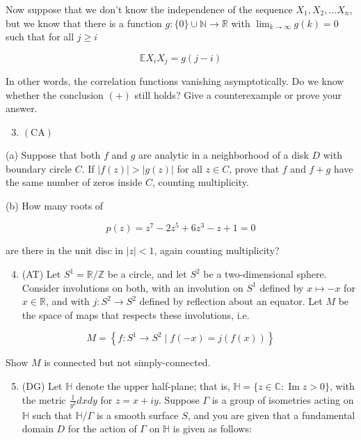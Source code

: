 \documentclass[10pt]{article}
\begin{document}
Now suppose that we don't know the independence of the sequence $X_{1}, X_{2}, \ldots X_{n}$, but we know that there is a function $g:\{0\} \cup \mathbb{N} \rightarrow \mathbb{R}$ with $\lim _{k \rightarrow \infty} g(k)=0$ such that for all $j \geq i$

$$
\mathbb{E} X_{i} X_{j}=g(j-i)
$$

In other words, the correlation functions vanishing asymptotically. Do we know whether the conclusion $(+)$ still holds? Give a counterexample or prove your answer.

\begin{enumerate}
  \setcounter{enumi}{2}
  \item $(\mathrm{CA})$
\end{enumerate}

(a) Suppose that both $f$ and $g$ are analytic in a neighborhood of a disk $D$ with boundary circle $C$. If $|f(z)|>|g(z)|$ for all $z \in C$, prove that $f$ and $f+g$ have the same number of zeros inside $C$, counting multiplicity.

(b) How many roots of

$$
p(z)=z^{7}-2 z^{5}+6 z^{3}-z+1=0
$$

are there in the unit disc in $|z|<1$, again counting multiplicity?

\begin{enumerate}
  \setcounter{enumi}{3}
  \item (AT) Let $S^{1}=\mathbb{R} / \mathbb{Z}$ be a circle, and let $S^{2}$ be a two-dimensional sphere. Consider involutions on both, with an involution on $S^{1}$ defined by $x \mapsto-x$
for $x \in \mathbb{R}$, and with $j: S^{2} \rightarrow S^{2}$ defined by reflection about an equator. Let $M$ be the space of maps that respects these involutions, i.e.
\end{enumerate}

$$
M=\left\{f: S^{1} \rightarrow S^{2} \mid f(-x)=j(f(x))\right\}
$$

Show $M$ is connected but not simply-connected.

\begin{enumerate}
  \setcounter{enumi}{4}
  \item (DG) Let $\mathbb{H}$ denote the upper half-plane; that is, $\mathbb{H}=\{z \in \mathbb{C}: \operatorname{Im} z>0\}$, with the metric $\frac{1}{y^{2}} d x d y$ for $z=x+i y$. Suppose $\Gamma$ is a group of isometries acting on $\mathbb{H}$ such that $\mathbb{H} / \Gamma$ is a smooth surface $S$, and you are given that a fundamental domain $D$ for the action of $\Gamma$ on $\mathbb{H}$ is given as follows:
\end{enumerate}
\end{document}
